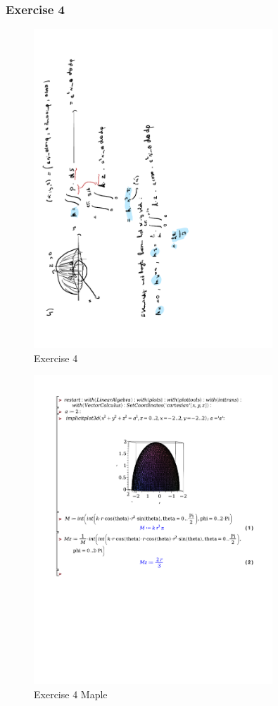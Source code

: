 \documentclass[a4paper]{report}
\begin{document}
\subsubsection{Exercise 4}

\begin{figure}[H]
	\centering
	\includegraphics[angle=-90, width=0.8\textwidth]{assets/huis_7_ex_4.pdf}
	\caption{Exercise 4}
	\label{fig:huis_7_ex_4}
\end{figure}

\begin{figure}[H]
	\centering
	\includegraphics[width=0.8\textwidth]{exercises/huis_7_ex_4.pdf}
	\caption{Exercise 4 Maple}
\end{figure}
\end{document}
